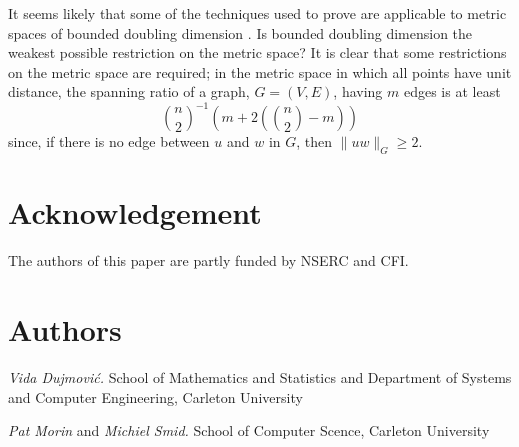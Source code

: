 \documentclass{patmorin}
\begin{document}
It seems likely that some of the techniques used to prove
 are applicable to metric spaces of bounded doubling
dimension \cite[Section~10.13]{heinonen:lectures}.  Is bounded doubling
dimension the weakest possible restriction on the metric space?  It is
clear that some restrictions on the metric space are required;
in the metric space in which all points have unit distance, the spanning
ratio of a graph, $G=(V,E)$, having $m$ edges is at least
\[
    \binom{n}{2}^{-1}\left(m + 2\left(\binom{n}{2}-m\right)\right) 
\]
since, if there is no edge between $u$ and $w$ in $G$, then $\|uw\|_G \ge 2$.

\section*{Acknowledgement}

The authors of this paper are partly funded by NSERC and CFI.

\section*{Authors}

\noindent\emph{Vida Dujmovi\'c.}
School of Mathematics and Statistics and Department of Systems and Computer Engineering, Carleton University

\noindent\emph{Pat Morin} and \emph{Michiel Smid.}
School of Computer Scence, Carleton University




\end{document}

